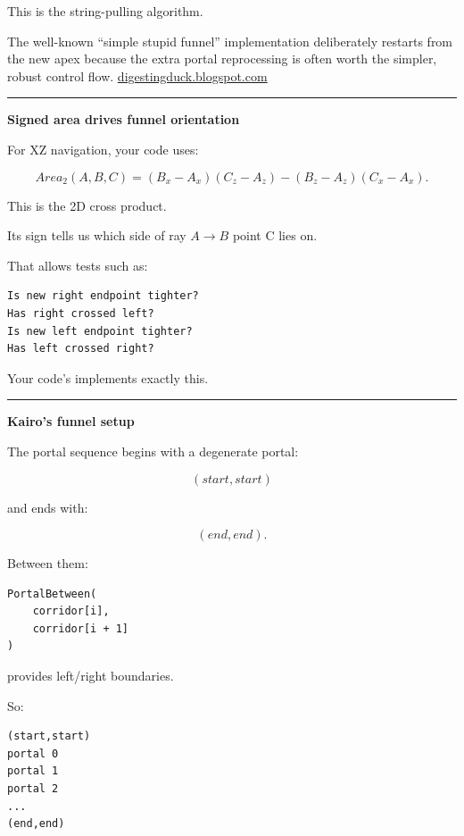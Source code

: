 This is the string-pulling algorithm.

The well-known ``simple stupid funnel'' implementation deliberately restarts from the new apex because the extra portal reprocessing is often worth the simpler, robust control flow. \href{https://digestingduck.blogspot.com/2010/03/simple-stupid-funnel-algorithm.html?utm_source=chatgpt.com}{digestingduck.blogspot.com}

\begin{center}\rule{0.5\linewidth}{0.5pt}\end{center}

\textbf{Signed area drives funnel orientation}

For XZ navigation, your code uses:

\[
Area_2(A,B,C)
=
(B_x-A_x)(C_z-A_z)
-
(B_z-A_z)(C_x-A_x).
\]

This is the 2D cross product.

Its sign tells us which side of ray \(A\rightarrow B\) point C lies on.

That allows tests such as:

\begin{verbatim}
Is new right endpoint tighter?
Has right crossed left?
Is new left endpoint tighter?
Has left crossed right?
\end{verbatim}

Your code's  implements exactly this.

\begin{center}\rule{0.5\linewidth}{0.5pt}\end{center}

\textbf{Kairo's funnel setup}

The portal sequence begins with a degenerate portal:

\[
(start,start)
\]

and ends with:

\[
(end,end).
\]

Between them:

\begin{verbatim}
PortalBetween(
    corridor[i],
    corridor[i + 1]
)
\end{verbatim}

provides left/right boundaries.

So:

\begin{verbatim}
(start,start)
portal 0
portal 1
portal 2
...
(end,end)
\end{verbatim}

